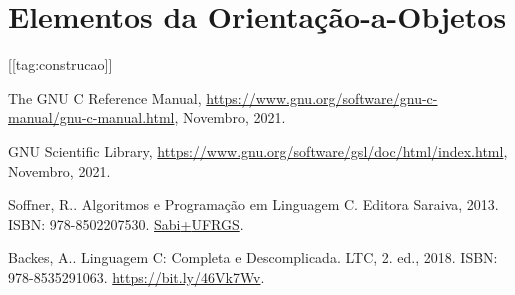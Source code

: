 \documentclass[12pt]{article}
\begin{document}
\section{Elementos da Orientação-a-Objetos}

[[tag:construcao]]


\ifisbook
\clearpage
{}
{}
\fi

\nocite{*}
\begin{thebibliography}{99}

  The GNU C Reference Manual, \url{https://www.gnu.org/software/gnu-c-manual/gnu-c-manual.html}, Novembro, 2021.
  
  GNU Scientific Library, \url{https://www.gnu.org/software/gsl/doc/html/index.html}, Novembro, 2021.
  
  Soffner, R.. Algoritmos e Programação em Linguagem C. Editora Saraiva, 2013. ISBN: 978-8502207530. \href{https://bit.ly/45VccHe}{Sabi{+}UFRGS}.

  Backes, A.. Linguagem C: Completa e Descomplicada. LTC, 2. ed., 2018. ISBN: 978-8535291063. \href{Sabi{+}UFRGS}{https://bit.ly/46Vk7Wv}.
  
\end{thebibliography}
\end{document}
